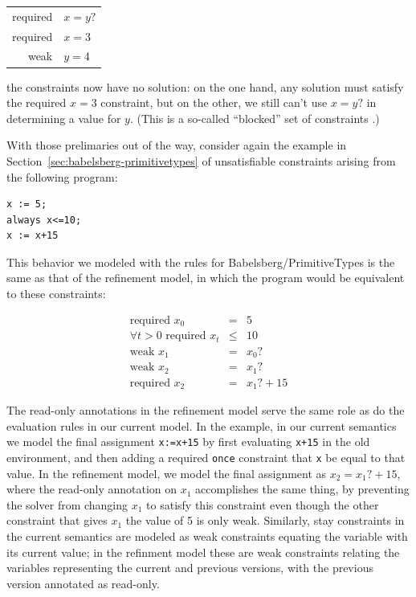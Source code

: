 \documentclass{article}
\begin{document}
\begin{tabular}{rl}
required & $x=y?$ \\
required & $x=3$ \\
weak     & $y=4$
\end{tabular}

the constraints now have no solution: on the one hand, any solution
must satisfy the required $x=3$ constraint, but on the other, we still
can't use $x=y?$ in determining a value for $y$.  (This is a so-called
``blocked'' set of constraints
\cite{borning-lisp-symbolic-computation-1992}.)

With those prelimaries out of the way, consider again the example in
Section~\ref{sec:babelsberg-primitivetypes} of unsatisfiable
constraints arising from the following program:

\begin{verbatim}
x := 5;
always x<=10;
x := x+15
\end{verbatim}

This behavior we modeled with the rules for Babelsberg/PrimitiveTypes
is the same as that of the refinement model, in which the program
would be equivalent to these constraints:

\begin{eqnarray*}
\mbox{required\ \ } x_0 & = & 5            \\
\forall t>0 \mbox{\ required\ \ } x_t & \leq & 10  \\
\mbox{weak\ \ } x_1 & = & x_0?             \\
\mbox{weak\ \ } x_2 & = & x_1?             \\
\mbox{required\ \ } x_2 & = & x_1? + 15
\end{eqnarray*}

The read-only annotations in the refinement model serve the same role
as do the evaluation rules in our current model.  In the example, in
our current semantics we model the final assignment \verb|x:=x+15| by
first evaluating \verb|x+15| in the old environment, and then adding a
required \verb|once| constraint that \verb|x| be equal to that value.
In the refinement model, we model the final assignment as $x_2 = x_1?
+ 15$, where the read-only annotation on $x_1$ accomplishes the same
thing, by preventing the solver from changing $x_1$ to satisfy this
constraint even though the other constraint that gives $x_1$ the value
of 5 is only weak.  Similarly, stay constraints in the current
semantics are modeled as weak constraints equating the variable with
its current value; in the refinment model these are weak constraints
relating the variables representing the current and previous versions,
with the previous version annotated as read-only.
\end{document}
